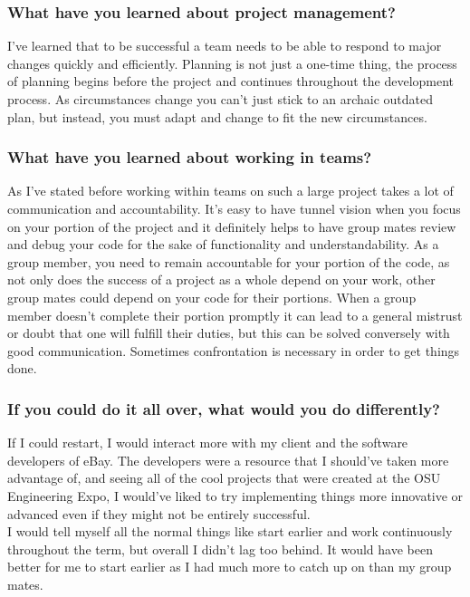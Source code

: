\subsubsection{What have you learned about project management?}
I’ve learned that to be successful a team needs to be able to respond to major changes quickly and efficiently. Planning is not just a one-time thing, the process of planning begins before the project and continues throughout the development process. As circumstances change you can’t just stick to an archaic outdated plan, but instead, you must adapt and change to fit the new circumstances.

\subsubsection{What have you learned about working in teams?}
As I’ve stated before working within teams on such a large project takes a lot of communication and accountability. It’s easy to have tunnel vision when you focus on your portion of the project and it definitely helps to have group mates review and debug your code for the sake of functionality and understandability. As a group member, you need to remain accountable for your portion of the code, as not only does the success of a project as a whole depend on your work, other group mates could depend on your code for their portions. When a group member doesn’t complete their portion promptly it can lead to a general mistrust or doubt that one will fulfill their duties, but this can be solved conversely with good communication. Sometimes confrontation is necessary in order to get things done.

\subsubsection{If you could do it all over, what would you do differently?}
If I could restart, I would interact more with my client and the software developers of eBay. The developers were a resource that I should've taken more advantage of, and seeing all of the cool projects that were created at the OSU Engineering Expo, I would've liked to try implementing things more innovative or advanced even if they might not be entirely successful. \\

I would tell myself all the normal things like start earlier and work continuously throughout the term, but overall I didn't lag too behind. It would have been better for me to start earlier as I had much more to catch up on than my group mates.